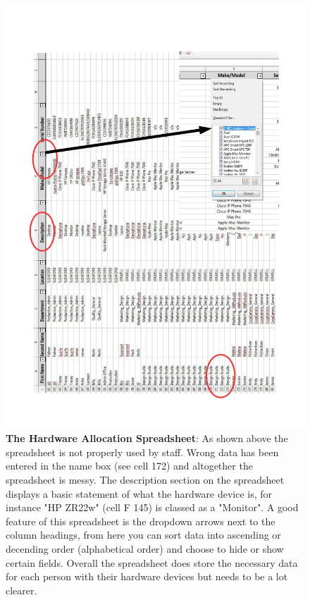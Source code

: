 \begin{figure}[H]
\includegraphics[width=.9\textwidth,height=.9\textheight,keepaspectratio]{Spreadsheet2.jpg}
\caption{\textbf{The Hardware Allocation Spreadsheet}: As shown above the spreadsheet is not properly used by staff. Wrong data has been entered in the name box (see cell 172) and altogether the spreadsheet is messy. The description section on the spreadsheet displays a basic statement of what the hardware device is, for instance "HP ZR22w" (cell F 145) is classed as a "Monitor". A good feature of this spreadsheet is the dropdown arrows next to the column headings, from here you can sort data into ascending or decending order (alphabetical order) and choose to hide or show certain fields. Overall the spreadsheet does store the necessary data for each person with their hardware devices but needs to be a lot clearer.} \label{Spreadsheet}
\end{figure}


